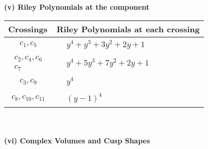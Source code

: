 \documentclass[1p]{elsarticle_modified}
\theoremstyle{definition}
\begin{document}
\newpage\renewcommand{\arraystretch}{1}
\flushleft \textbf{(v) Riley Polynomials at the component}\newline \\
\begin{tabular}{m{50pt}|m{274pt}}
Crossings & \hspace{64pt}Riley Polynomials at each crossing \\
\hline $$\begin{aligned}c_{1},c_{5}\end{aligned}$$&$\begin{aligned}
&y^4+y^3+3 y^2+2 y+1
\end{aligned}$\\
\hline $$\begin{aligned}c_{2},c_{4},c_{6}\\c_{7}\end{aligned}$$&$\begin{aligned}
&y^4+5 y^3+7 y^2+2 y+1
\end{aligned}$\\
\hline $$\begin{aligned}c_{3},c_{9}\end{aligned}$$&$\begin{aligned}
&y^4
\end{aligned}$\\
\hline $$\begin{aligned}c_{8},c_{10},c_{11}\end{aligned}$$&$\begin{aligned}
&(y-1)^4
\end{aligned}$\\
\hline
\end{tabular}\\~\\
\newpage\flushleft \textbf{(vi) Complex Volumes and Cusp Shapes}
\end{document}
